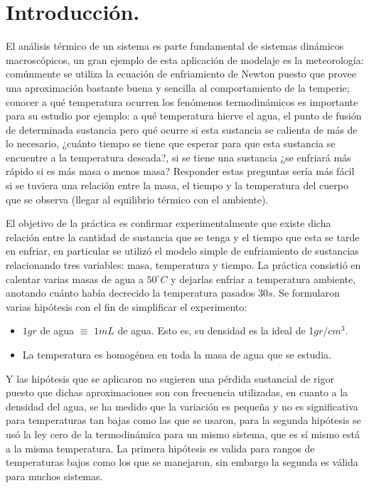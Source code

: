 \documentclass[a4paper]{article}
\begin{document}

\section{Introducción.}
El análisis térmico de un sistema es parte fundamental de sistemas dinámicos macroscópicos, un gran ejemplo de esta aplicación de modelaje es la meteorología: comúnmente se utiliza la ecuación de enfriamiento de Newton puesto que provee una aproximación bastante buena y sencilla al comportamiento de la temperie; conocer a qué temperatura ocurren los fenómenos termodinámicos es importante para su estudio por ejemplo: a qué temperatura hierve el agua, el punto de fusión de determinada sustancia pero qué ocurre si esta sustancia se calienta de más de lo necesario, ¿cuánto tiempo se tiene que esperar para que esta sustancia se encuentre a la temperatura deseada?, si se tiene una sustancia ¿se enfriará más rápido si es más masa o menos masa? Responder estas preguntas sería más fácil si se tuviera una relación entre la masa, el tiempo y la temperatura del cuerpo que se observa (llegar al equilibrio térmico con el ambiente). 

El objetivo de la práctica es confirmar experimentalmente que existe dicha relación entre la cantidad de sustancia que se tenga y el tiempo que esta se tarde en enfriar, en particular se utilizó el modelo simple de enfriamiento de sustancias relacionando tres variables: masa, temperatura y tiempo. La práctica consistió en calentar varias masas de agua a $50^{\circ}C$ y dejarlas enfriar a temperatura ambiente, anotando cuánto había decrecido la temperatura pasados 30$s$. Se formularon varias hipótesis con el fin de simplificar el experimento:
\begin{itemize}
    \item $1gr$ de agua $\equiv$ $1mL$ de agua. Esto es, su densidad es la ideal de 1$gr/cm^3$.
    \item La temperatura es homogénea en toda la masa de agua que se estudia.
\end{itemize}

Y las hipótesis que se aplicaron no sugieren una pérdida sustancial de rigor puesto que dichas aproximaciones son con frecuencia utilizadas, en cuanto a la densidad del agua, se ha medido que la variación es pequeña y no es significativa para temperaturas tan bajas como las que se usaron, para la segunda hipótesis se usó la ley cero de la termodinámica para un mismo sistema, que es sí mismo está a la misma temperatura. La primera hipótesis es valida para rangos de temperaturas bajos como los que se manejaron, sin embargo la segunda es válida para muchos sistemas.
\end{document}
